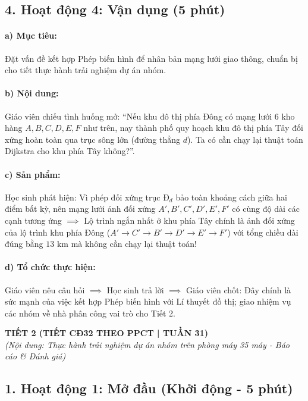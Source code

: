 \documentclass[12pt, a4paper]{article}
\begin{document}
\subsection*{4. Hoạt động 4: Vận dụng (5 phút)}

\paragraph{a) Mục tiêu:} Đặt vấn đề kết hợp Phép biến hình để nhân bản mạng lưới giao thông, chuẩn bị cho tiết thực hành trải nghiệm dự án nhóm.

\paragraph{b) Nội dung:} Giáo viên chiếu tình huống mở: ``Nếu khu đô thị phía Đông có mạng lưới 6 kho hàng $A, B, C, D, E, F$ như trên, nay thành phố quy hoạch khu đô thị phía Tây đối xứng hoàn toàn qua trục sông lớn (đường thẳng $d$). Ta có cần chạy lại thuật toán Dijkstra cho khu phía Tây không?''.

\paragraph{c) Sản phẩm:} Học sinh phát hiện: Vì phép đối xứng trục $Đ_d$ bảo toàn khoảng cách giữa hai điểm bất kỳ, nên mạng lưới ảnh đối xứng $A', B', C', D', E', F'$ có cùng độ dài các cạnh tương ứng $\implies$ Lộ trình ngắn nhất ở khu phía Tây chính là ảnh đối xứng của lộ trình khu phía Đông ($A' \to C' \to B' \to D' \to E' \to F'$) với tổng chiều dài đúng bằng $13\text{ km}$ mà không cần chạy lại thuật toán!

\paragraph{d) Tổ chức thực hiện:} Giáo viên nêu câu hỏi $\implies$ Học sinh trả lời $\implies$ Giáo viên chốt: Đây chính là sức mạnh của việc kết hợp Phép biến hình với Lí thuyết đồ thị; giao nhiệm vụ các nhóm về nhà phân công vai trò cho Tiết 2.

\newpage

\begin{center}
    \textbf{\large TIẾT 2 (TIẾT CĐ32 THEO PPCT | TUẦN 31)}\\[4pt]
    \textit{(Nội dung: Thực hành trải nghiệm dự án nhóm trên phòng máy 35 máy - Báo cáo \& Đánh giá)}
\end{center}

\subsection*{1. Hoạt động 1: Mở đầu (Khởi động - 5 phút)}
\end{document}
